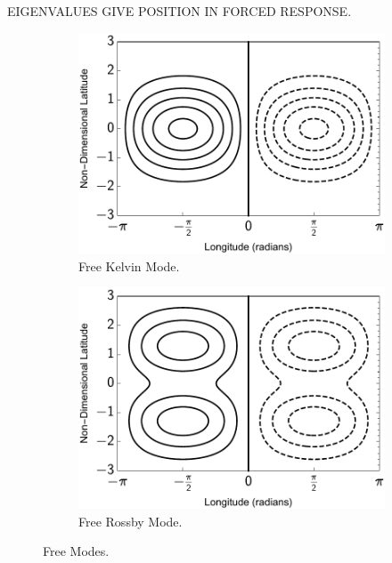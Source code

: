 EIGENVALUES GIVE POSITION IN FORCED RESPONSE.

\begin{figure}
  \centering
  \begin{subfigure}[b]{0.49\textwidth}
    \includegraphics[width=1.0\textwidth]{figures/wave-mean-flow/free-kelvin-mode.pdf}
    \caption{Free Kelvin Mode.}
    \label{fig:free-kelvin-mode}
  \end{subfigure}
  \begin{subfigure}[b]{0.49\textwidth}
    \includegraphics[width=1.0\textwidth]{figures/wave-mean-flow/free-rossby-mode.pdf}
    \caption{Free Rossby Mode.}
    \label{fig:free-rossby-mode}
  \end{subfigure}
  \caption{Free Modes.}
  \label{fig:free-kelvin-rossby-mode}
\end{figure}

